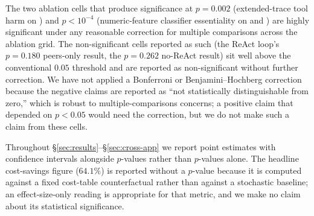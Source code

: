  The two ablation cells that produce significance at $p = 0.002$ (extended-trace tool harm on \dsob{}) and $p < 10^{-4}$ (numeric-feature classifier essentiality on \dsob{} and \dsotel{}) are highly significant under any reasonable correction for multiple comparisons across the ablation grid. The non-significant cells reported as such (the ReAct loop's $p = 0.180$ peers-only result, the $p = 0.262$ no-ReAct result) sit well above the conventional $0.05$ threshold and are reported as non-significant without further correction. We have not applied a Bonferroni or Benjamini--Hochberg correction because the negative claims are reported as ``not statistically distinguishable from zero,'' which is robust to multiple-comparisons concerns; a positive claim that depended on $p < 0.05$ would need the correction, but we do not make such a claim from these cells.

 Throughout \S\ref{sec:results}--\S\ref{sec:cross-app} we report point estimates with confidence intervals alongside $p$-values rather than $p$-values alone. The headline cost-savings figure ($64.1\%$) is reported without a $p$-value because it is computed against a fixed cost-table counterfactual rather than against a stochastic baseline; an effect-size-only reading is appropriate for that metric, and we make no claim about its statistical significance.
